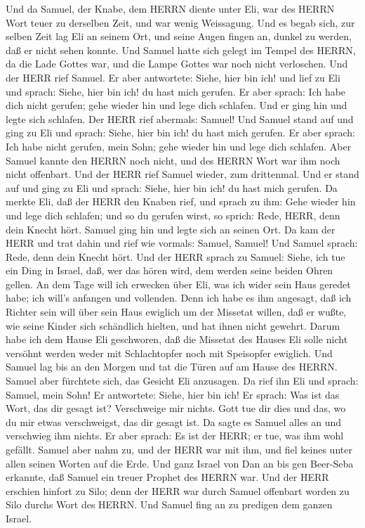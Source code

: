  Und da Samuel, der Knabe, dem HERRN diente unter Eli, war
des HERRN Wort teuer zu derselben Zeit, und war wenig Weissagung.
 Und es begab sich, zur selben Zeit lag Eli an seinem Ort,
und seine Augen fingen an, dunkel zu werden, daß er nicht sehen konnte.
 Und Samuel hatte sich gelegt im Tempel des HERRN, da die
Lade Gottes war, und die Lampe Gottes war noch nicht verloschen.
 Und der HERR rief Samuel. Er aber antwortete: Siehe, hier
bin ich!  und lief zu Eli und sprach: Siehe, hier bin ich!
du hast mich gerufen. Er aber sprach: Ich habe dich nicht gerufen; gehe
wieder hin und lege dich schlafen. Und er ging hin und legte sich
schlafen.  Der HERR rief abermals: Samuel! Und Samuel stand
auf und ging zu Eli und sprach: Siehe, hier bin ich! du hast mich
gerufen. Er aber sprach: Ich habe nicht gerufen, mein Sohn; gehe wieder
hin und lege dich schlafen.  Aber Samuel kannte den HERRN
noch nicht, und des HERRN Wort war ihm noch nicht offenbart.
 Und der HERR rief Samuel wieder, zum drittenmal. Und er
stand auf und ging zu Eli und sprach: Siehe, hier bin ich! du hast mich
gerufen. Da merkte Eli, daß der HERR den Knaben rief,  und
sprach zu ihm: Gehe wieder hin und lege dich schlafen; und so du gerufen
wirst, so sprich: Rede, HERR, denn dein Knecht hört. Samuel ging hin und
legte sich an seinen Ort.  Da kam der HERR und trat dahin
und rief wie vormals: Samuel, Samuel! Und Samuel sprach: Rede, denn dein
Knecht hört.  Und der HERR sprach zu Samuel: Siehe, ich tue
ein Ding in Israel, daß, wer das hören wird, dem werden seine beiden
Ohren gellen.  An dem Tage will ich erwecken über Eli, was
ich wider sein Haus geredet habe; ich will's anfangen und vollenden.
 Denn ich habe es ihm angesagt, daß ich Richter sein will
über sein Haus ewiglich um der Missetat willen, daß er wußte, wie seine
Kinder sich schändlich hielten, und hat ihnen nicht gewehrt.
 Darum habe ich dem Hause Eli geschworen, daß die Missetat
des Hauses Eli solle nicht versöhnt werden weder mit Schlachtopfer noch
mit Speisopfer ewiglich.  Und Samuel lag bis an den Morgen
und tat die Türen auf am Hause des HERRN. Samuel aber fürchtete sich,
das Gesicht Eli anzusagen.  Da rief ihn Eli und sprach:
Samuel, mein Sohn! Er antwortete: Siehe, hier bin ich!  Er
sprach: Was ist das Wort, das dir gesagt ist? Verschweige mir nichts.
Gott tue dir dies und das, wo du mir etwas verschweigst, das dir gesagt
ist.  Da sagte es Samuel alles an und verschwieg ihm
nichts. Er aber sprach: Es ist der HERR; er tue, was ihm wohl gefällt.
 Samuel aber nahm zu, und der HERR war mit ihm, und fiel
keines unter allen seinen Worten auf die Erde.  Und ganz
Israel von Dan an bis gen Beer-Seba erkannte, daß Samuel ein treuer
Prophet des HERRN war.  Und der HERR erschien hinfort zu
Silo; denn der HERR war durch Samuel offenbart worden zu Silo durchs
Wort des HERRN. Und Samuel fing an zu predigen dem ganzen Israel.

